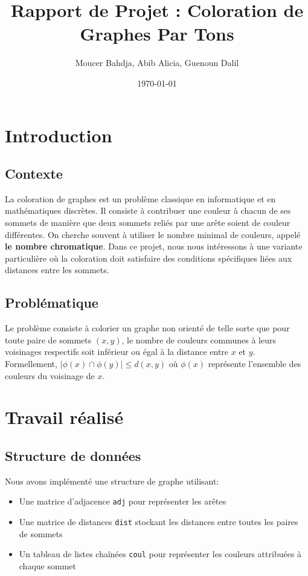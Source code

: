 \documentclass[a4paper,11pt]{article}
\title{\textbf{Rapport de Projet : Coloration de Graphes Par Tons}}
\author{Moucer Bahdja, Abib Alicia, Guenoun Dalil}
\date{\today}
\begin{document}
\maketitle

\section{Introduction}
\subsection{Contexte}
La coloration de graphes est un problème classique en informatique et en mathématiques discrètes. 
Il consiste à contribuer une couleur à chacun de ses sommets de manière que deux sommets reliés par une arête soient de couleur différentes. On cherche souvent à utiliser le nombre minimal de couleurs, appelé \textbf{le nombre chromatique}.
Dans ce projet, nous nous intéressons à une variante particulière où la coloration doit satisfaire des conditions spécifiques liées aux distances entre les sommets.

\subsection{Problématique}
Le problème consiste à colorier un graphe non orienté de telle sorte que pour toute paire de sommets $(x,y)$, 
le nombre de couleurs communes à leurs voisinages respectifs soit inférieur ou égal à la distance entre $x$ et $y$. 
Formellement, $|\phi(x) \cap \phi(y)| \leq d(x,y)$ où $\phi(x)$ représente l'ensemble des couleurs du voisinage de $x$.

\section{Travail réalisé}

\subsection{Structure de données}
Nous avons implémenté une structure de graphe utilisant:
\begin{itemize}
\item Une matrice d'adjacence \texttt{adj} pour représenter les arêtes
\item Une matrice de distances \texttt{dist} stockant les distances entre toutes les paires de sommets
\item Un tableau de listes chaînées \texttt{coul} pour représenter les couleurs attribuées à chaque sommet
\end{itemize}
\end{document}
